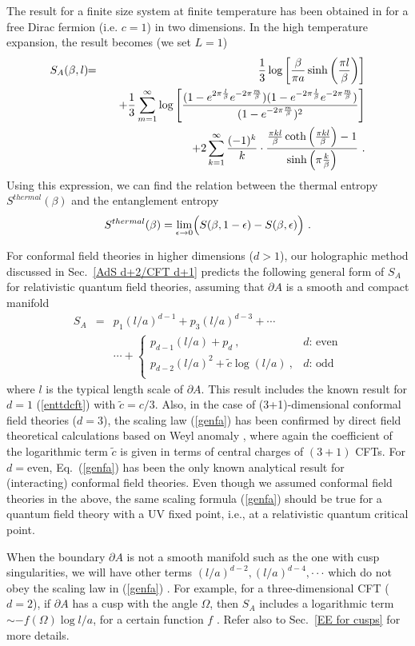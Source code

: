 \documentclass[12pt]{article}
\def\ep{{\epsilon}}
\def\frac#1#2{{#1\over #2}}
\def\de{\partial}
\def\f {\frac}
\def\ti{\tilde}
\def\ddd{\cdot\cdot\cdot}
\def\no{\nonumber \\}
\def\ep{\epsilon}
\def\ep{{\epsilon}}
\def\frac#1#2{{#1\over #2}}
\def\be{\begin{equation}}
\def\ee{\end{equation}}
\def\ba{\begin{eqnarray}}
\def\ea{\end{eqnarray}}
\begin{document}
The result for a finite size system at finite temperature has been obtained
in \cite{Azeyanagi:2007bj} for a free Dirac fermion (i.e. $c=1$) in two dimensions.
In the high temperature expansion, the result becomes (we set $L=1$)
\ba S_{A}(\beta,l)
\!\!&=&\!\!
\f{1}{3}\log\left[\f{\beta}{\pi
 a}\sinh\left(\f{\pi
l}{\beta}\right)\right] \no
&&\quad +\f{1}{3}\sum_{m=1}^\infty
\log\left[\f{(1-e^{2\pi \f{l}{\beta}}e^{-2\pi \f{m}{\beta}
})(1-e^{-2\pi \f{l}{\beta}}e^{-2\pi \f{m}{\beta}})}{(1-e^{-2\pi
\f{m}{\beta}})^2}\right]\no  &&\quad + 2\sum_{k=1}^\infty
\f{(-1)^{k}}{k}\cdot\f{\f{\pi kl}{\beta}\coth\left(\f{\pi
kl}{\beta}\right)-1}{\sinh\left(\pi \f{k}{\beta}\right)} \ .
\label{toth}\ea
Using this expression, we can find the relation between
the thermal entropy $S^{thermal}(\beta)$ and the entanglement entropy
\be
S^{thermal}(\beta)=\lim_{\ep\to 0}\Bigl(S(\beta,1-\ep)-S(\beta,\ep)\Bigr) \ .
\ee


For conformal field theories in higher dimensions ($d>1$),
our holographic method discussed in Sec.\ \ref{AdS d+2/CFT d+1}
predicts the following general form of $S_A$
for relativistic quantum field theories,
assuming that $\de A$ is a smooth and compact
manifold
\ba
S_A \!\!&=&\!\!
  p_1  \left(l/a\right)^{d-1}
+ p_3 \left(l/a \right)^{d-3}
+\cdots   \no
&&
\cdots +\left\{
\begin{array}{ll}
\displaystyle p_{d-1}\left(l/a\right) + p_d  \ , &
 \mbox{$d$: even}    \\
\displaystyle p_{d-2} \left(l/a\right)^{2} + \ti{c} \log
\left(l/a\right) \ ,
&  \mbox{$d$: odd}    \\
\end{array}
\right.\label{genfa}
\ea
where $l$ is the typical length scale of $\partial A$.
This result includes the known result for $d=1$ (\ref{enttdcft}) with $\tilde{c}=c/3$.
Also, in the case of (3+1)-dimensional
conformal field theories ($d=3$),
the scaling law (\ref{genfa})
has been confirmed by direct field theoretical calculations
based on Weyl anomaly \cite{RuTaL},
where again the coefficient of the logarithmic term $\tilde{c}$
is given in terms of central charges of $(3+1)$ CFTs.
For $d=\mathrm{even}$,
Eq.\ (\ref{genfa}) has been the only known analytical result
for (interacting) conformal field theories.
Even though we assumed conformal field theories in the above, the same
scaling formula (\ref{genfa}) should be true for a quantum field theory
with a UV fixed point, i.e.,
at a relativistic quantum critical point.

When the boundary $\de A$ is not a smooth manifold such as the one with cusp
singularities, we will have other terms $(l/a)^{d-2},(l/a)^{d-4},\ddd$
which do not obey the scaling law in (\ref{genfa}) \cite{Fu}. For example, for a three-dimensional
CFT ($d=2$), if $\de A$ has a cusp with the angle $\Omega$, then $S_A$ includes a
logarithmic term $\sim -f(\Omega)\log l/a$, for a certain function $f$
\cite{Casini:2006hu,Casini:2008as}. Refer also to
Sec.\ \ref{EE for cusps} for more details.
\end{document}
